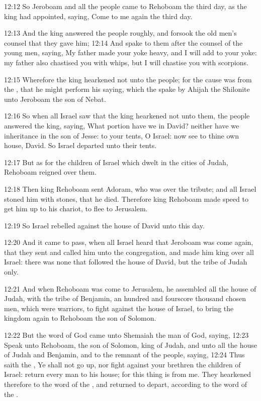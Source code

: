 12:12 So Jeroboam and all the people came to Rehoboam the third day, as the king had appointed, saying, Come to me again the third day.

12:13 And the king answered the people roughly, and forsook the old men's counsel that they gave him; 12:14 And spake to them after the counsel of the young men, saying, My father made your yoke heavy, and I will add to your yoke: my father also chastised you with whips, but I will chastise you with scorpions.

12:15 Wherefore the king hearkened not unto the people; for the cause was from the \LORD, that he might perform his saying, which the \LORD spake by Ahijah the Shilonite unto Jeroboam the son of Nebat.

12:16 So when all Israel saw that the king hearkened not unto them, the people answered the king, saying, What portion have we in David?  neither have we inheritance in the son of Jesse: to your tents, O Israel: now see to thine own house, David. So Israel departed unto their tents.

12:17 But as for the children of Israel which dwelt in the cities of Judah, Rehoboam reigned over them.

12:18 Then king Rehoboam sent Adoram, who was over the tribute; and all Israel stoned him with stones, that he died. Therefore king Rehoboam made speed to get him up to his chariot, to flee to Jerusalem.

12:19 So Israel rebelled against the house of David unto this day.

12:20 And it came to pass, when all Israel heard that Jeroboam was come again, that they sent and called him unto the congregation, and made him king over all Israel: there was none that followed the house of David, but the tribe of Judah only.

12:21 And when Rehoboam was come to Jerusalem, he assembled all the house of Judah, with the tribe of Benjamin, an hundred and fourscore thousand chosen men, which were warriors, to fight against the house of Israel, to bring the kingdom again to Rehoboam the son of Solomon.

12:22 But the word of God came unto Shemaiah the man of God, saying, 12:23 Speak unto Rehoboam, the son of Solomon, king of Judah, and unto all the house of Judah and Benjamin, and to the remnant of the people, saying, 12:24 Thus saith the \LORD, Ye shall not go up, nor fight against your brethren the children of Israel: return every man to his house; for this thing is from me. They hearkened therefore to the word of the \LORD, and returned to depart, according to the word of the \LORD.

